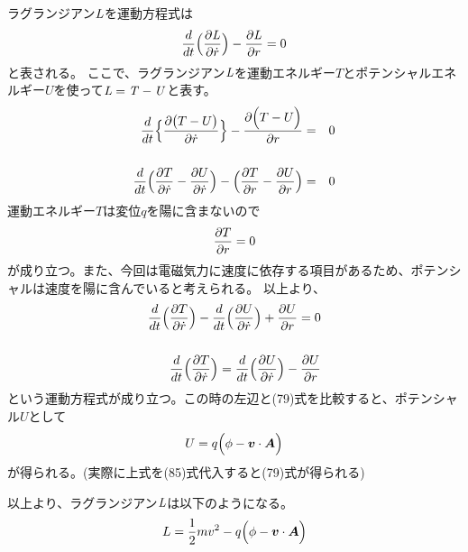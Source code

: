 \documentclass[11pt,a4paper]{jsarticle}
\begin{document}
ラグランジアン$\it{L}$を運動方程式は
\begin{equation}
  \frac{d}{dt}\Bigl( \frac{\partial \it{L}}{\partial \dot{r}} \Bigr) - \frac{\partial \it{L}}{\partial r} = 0\\
\end{equation}
と表される。
ここで、ラグランジアン$\it{L}$を運動エネルギー$T$とポテンシャルエネルギー$U$を使って$\it{L}=T-U$と表す。
\begin{eqnarray}
  \frac{d}{dt} \Bigl\{ \frac{\partial \bigl(T-U\bigr)}{\partial \dot{r}} \Bigr\} - \frac{\partial \Bigl(T-U\Bigr)}{\partial r} &=& 0
  \\
  \nonumber\\
   \frac{d}{dt} \Bigl( \frac{\partial T}{\partial \dot{r}} - \frac{\partial U}{\partial \dot{r}} \Bigr) - \Bigl( \frac{\partial T}{\partial r} - \frac{\partial U}{\partial r} \Bigr) &=& 0
\end{eqnarray}
運動エネルギー$T$は変位$q$を陽に含まないので
\begin{equation}
  \frac{\partial T}{\partial r} = 0\\
\end{equation}
が成り立つ。また、今回は電磁気力に速度に依存する項目があるため、ポテンシャルは速度を陽に含んでいると考えられる。
以上より、
\begin{eqnarray}
    \frac{d}{dt} \Bigl( \frac{\partial T}{\partial \dot{r}} \Bigr) - \frac{d}{dt} \Bigl( \frac{\partial U}{\partial \dot{r}} \Bigr) + \frac{\partial U}{\partial r} = 0
    \\
    \nonumber\\
    \frac{d}{dt} \Bigl( \frac{\partial T}{\partial \dot{r}} \Bigr) = \frac{d}{dt} \Bigl( \frac{\partial U}{\partial \dot{r}} \Bigr) - \frac{\partial U}{\partial r}
\end{eqnarray}
という運動方程式が成り立つ。この時の左辺と(79)式を比較すると、ポテンシャル$U$として
\begin{equation}
  U = q \Bigl( \phi - \bm{v} \cdot \bm{A} \Bigr)
\end{equation}
が得られる。(実際に上式を(85)式代入すると(79)式が得られる)

以上より、ラグランジアン$\it{L}$は以下のようになる。
\begin{equation}
  L = \frac{1}{2} m v^2 - q \Bigl( \phi - \bm{v} \cdot \bm{A} \Bigr) \\
\end{equation}
\end{document}
